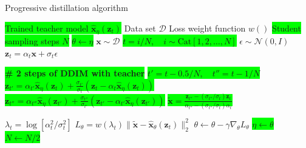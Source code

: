 \begin{minipage}[t]{0.49\linewidth}
    
    \begin{algorithm}[H]
        \centering
        \caption{Progressive distillation algorithm \cite{v_prediction}}
        \label{alg:progressive_distillation_algorithm}
        \begin{algorithmic}
            \Require \colorbox{lime} {Trained teacher model $\hat{\mathbf{x}}_{\eta}(\mathbf{z}_t)$}
            \Require Data set $\mathcal{D}$
            \Require Loss weight function $w()$
            \Require \colorbox{lime}{Student sampling steps $N$}
                \State \colorbox{lime}{$\theta \gets \eta$} 
                    \State $\mathbf{x} \sim \mathcal{D}$
                    \State \colorbox{lime}{$t = i/N, \quad i \sim \text{Cat}[1,2,\dots,N]$}
                    \State $\epsilon \sim \mathcal{N}(0, I)$
                    \State $\mathbf{z}_t = \alpha_t \mathbf{x} + \sigma_t \epsilon$
                    
                    \State \colorbox{lime}{{\textbf{\# 2 steps of DDIM with teacher}}}
                    \State \colorbox{lime}{{$t' = t - 0.5/N, \quad t'' = t - 1/N$}}
                    \State \colorbox{lime}{{$\mathbf{z}_{t'} = \alpha_{t'} \hat{\mathbf{x}}_{\eta}(\mathbf{z}_t) + \frac{\sigma_{t'}}{\sigma_t} (\mathbf{z}_t - \alpha_t \hat{\mathbf{x}}_{\eta}(\mathbf{z}_t))$}}
                    \State \colorbox{lime}{{$\mathbf{z}_{t''} = \alpha_{t''} \hat{\mathbf{x}}_{\eta}(\mathbf{z}_{t'}) + \frac{\sigma_{t''}}{\sigma_{t'}} (\mathbf{z}_{t'} - \alpha_{t'} \hat{\mathbf{x}}_{\eta}(\mathbf{z}_{t'}))$}}
                    \State \colorbox{lime}{{$\tilde{\mathbf{x}} = \frac{\mathbf{z}_{t''} - (\sigma_{t''}/\sigma_t) \mathbf{z}_t}{\alpha_{t''} - (\sigma_{t''}/\sigma_t) \alpha_t}$}} 
                    
                    \State $\lambda_t = \log[\alpha_t^2/\sigma_t^2]$
                    \State $L_{\theta} = w(\lambda_t) \|\tilde{\mathbf{x}} - \hat{\mathbf{x}}_{\theta}(\mathbf{z}_t)\|_2^2$
                    \State $\theta \gets \theta - \gamma \nabla_{\theta} L_{\theta}$
                \EndWhile
                \State \colorbox{lime}{$\eta \gets \theta$} 
                \State \colorbox{lime}{$N \gets N/2$} 
            \EndFor
        \end{algorithmic}
    \end{algorithm}
\end{minipage}











